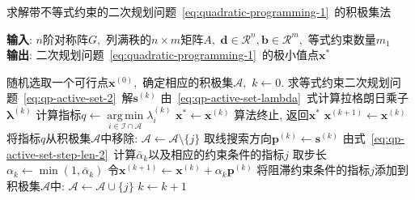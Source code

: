 \documentclass{SBCbookchapter}
\newcommand{\V}[1]{{\bm{#1}}}
\DeclareMathOperator*{\argmin}{arg\,min}
\newcommand{\R}{\mathcal{R}}
\numberwithin{equation}{section}
\begin{document}
\begin{algorithm}[ht]
\caption{求解带不等式约束的二次规划问题~\eqref{eq:quadratic-programming-1}~的积极集法}
\label{algo:active-set}
\hspace*{\algorithmicindent} \textbf{输入}: $n$阶对称阵$G,$ 列满秩的$n \times m$矩阵$A,$ $\V{d} \in \R^n, \V{b} \in \R^m,$ 等式约束数量$m_1$ \\
\hspace*{\algorithmicindent} \textbf{输出}: 二次规划问题~\eqref{eq:quadratic-programming-1}~的极小值点$\V{x}^*$
\begin{algorithmic}[1]
\STATE 随机选取一个可行点$\V{x}^{(0)},$ 确定相应的积极集$\mathcal{A},$ $k \gets 0.$
    \STATE 求等式约束二次规划问题~\eqref{eq:qp-active-set-2}~解$\V{s}^{(k)}$
    \IF{$\V{s}^{(k)} = 0$}
        \STATE 由~\eqref{eq:qp-active-set-lambda}~式计算拉格朗日乘子$\V{\lambda}^{(k)}$
        \STATE 计算指标$q \gets \argmin\limits_{i \in \mathcal{I} \cap \mathcal{A}} \lambda_i^{(k)}$
            \STATE $\V{x}^* \gets \V{x}^{(k)}$
            \STATE 算法终止, 返回$\V{x}^*$
        \ELSE
            \STATE $\V{x}^{(k+1)} \gets \V{x}^{(k)}$
            \STATE 将指标$q$从积极集$\mathcal{A}$中移除: $\mathcal{A} \gets \mathcal{A} \setminus \{ j \}$
        \ENDIF
    \ELSE
        \STATE 取线搜索方向$\V{p}^{(k)} \gets \V{s}^{(k)}$
        \STATE 由式~\eqref{eq:qp-active-set-step-len-2}~计算$\bar{\alpha}_k$以及相应的约束条件的指标$j$
        \STATE 取步长$\alpha_k \gets \min (1, \bar{\alpha}_k)$
        \STATE 令$\V{x}^{(k+1)} \gets \V{x}^{(k)} + \alpha_k \V{p}^{(k)}$
            \STATE 将阻滞约束条件的指标$j$添加到积极集$\mathcal{A}$中: $\mathcal{A} \gets \mathcal{A} \cup \{ j \}$
        \ENDIF
    \ENDIF
    $k \gets k + 1$
\ENDWHILE
\end{algorithmic}
\end{algorithm}
\end{document}
